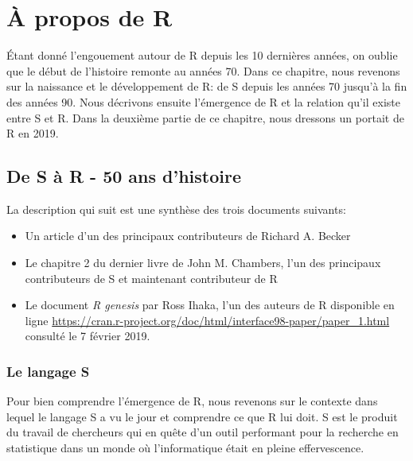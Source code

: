 \documentclass[]{article}
\providecommand{\tightlist}{%
  \setlength{\itemsep}{0pt}\setlength{\parskip}{0pt}}
\begin{document}
\hypertarget{uxe0-propos-de-r}{%
\section{À propos de R}\label{uxe0-propos-de-r}}

Étant donné l'engouement autour de R depuis les 10 dernières années, on oublie
que le début de l'histoire remonte au années 70. Dans ce chapitre, nous revenons
sur la naissance et le développement de R: de S depuis les années 70 jusqu'à la
fin des années 90. Nous décrivons ensuite l'émergence de R et la relation qu'il
existe entre S et R. Dans la deuxième partie de ce chapitre, nous dressons un
portait de R en 2019.

\hypertarget{de-s-uxe0-r---50-ans-dhistoire}{%
\subsection{De S à R - 50 ans d'histoire}\label{de-s-uxe0-r---50-ans-dhistoire}}

La description qui suit est une synthèse des trois documents suivants:

\begin{itemize}
\tightlist
\item
  Un article d'un des principaux contributeurs de Richard A. Becker \citep{becker_brief_1994}
\item
  Le chapitre 2 du dernier livre de John M. Chambers, l'un des
  principaux contributeurs de S et maintenant contributeur de R \citep{chambers_extending_2016}
\item
  Le document \emph{R genesis} par Ross Ihaka, l'un des auteurs de R disponible en ligne \url{https://cran.r-project.org/doc/html/interface98-paper/paper_1.html} consulté le 7 février 2019.
\end{itemize}

\hypertarget{le-langage-s}{%
\subsubsection{Le langage S}\label{le-langage-s}}

Pour bien comprendre l'émergence de R, nous revenons sur le contexte dans lequel le langage S a vu le jour et comprendre ce que R lui doit. S est le produit du travail de chercheurs qui
en quête d'un outil performant pour la recherche en statistique dans un monde où l'informatique était en pleine effervescence.
\end{document}

